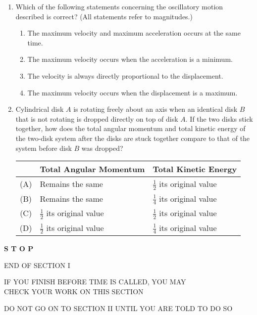 \documentclass[11pt]{article}
\newcommand{\pic}[2]{\texttt{[image: \#2]}}
\begin{document}
\begin{multicols}{2}
\begin{enumerate}[leftmargin=18pt,resume]
  \item Which of the following statements concerning the oscillatory motion
    described is correct? (All statements refer to magnitudes.)
    \label{mass2}
    \begin{enumerate}[nosep,leftmargin=18pt,label=(\Alph*)]
    \item The maximum velocity and maximum acceleration occurs at the same time.
    \item The maximum velocity occurs when the acceleration is a minimum.
    \item The velocity is always directly proportional to the displacement.
    \item The maximum velocity occurs when the displacement is a maximum.
    \end{enumerate}
%
%  
  \item Cylindrical disk $A$ is rotating freely about an axis when an
    identical disk $B$ that is not rotating is dropped directly on top of disk
    $A$. If the two disks stick together, how does the total angular momentum
    and total kinetic energy of the two-disk system after the disks are stuck
    together compare to that of the system before disk $B$ was dropped?
  
    \begin{tabular}{cll}
      & Total Angular Momentum & Total Kinetic Energy\\
      \hline
      (A) & Remains the same & $\frac12$ its original value\\
      (B) & Remains the same & $\frac14$ its original value\\
      (C) & $\frac12$ its original value & $\frac12$ its original value\\
      (D) & $\frac12$ its original value & $\frac14$ its original value
    \end{tabular}
  \end{enumerate}
\end{multicols}
\begin{center}
  \textbf{\LARGE S T O P}
  
  \vspace{.3in}END OF SECTION I

  \vspace{.3in}IF YOU FINISH BEFORE TIME IS CALLED, YOU MAY\\
  CHECK YOUR WORK ON THIS SECTION

  \vspace{.3in}DO NOT GO ON TO SECTION II UNTIL YOU ARE TOLD TO DO SO
\end{center}
\end{document}
